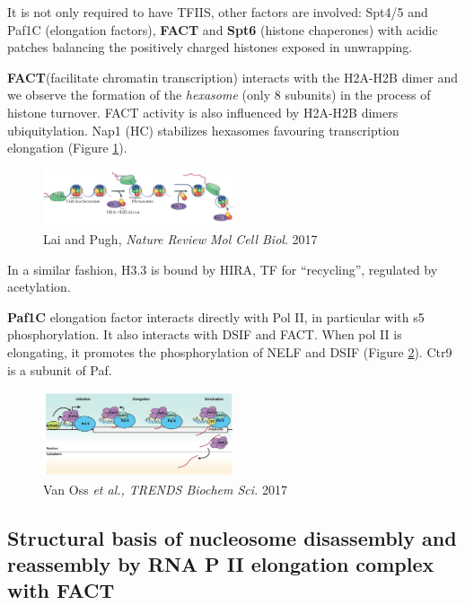 It is not only required to have TFIIS, other factors are involved: Spt4/5 and Paf1C (elongation factors), \textbf{FACT} and \textbf{Spt6} (histone chaperones) with acidic patches balancing the positively charged histones exposed in unwrapping.

\textbf{FACT}(facilitate chromatin transcription) interacts with the H2A-H2B dimer and we observe the formation of the \emph{hexasome} (only 8 subunits) in the process of histone turnover. FACT activity is also influenced by H2A-H2B dimers ubiquitylation. Nap1 (HC) stabilizes hexasomes favouring transcription elongation (Figure \ref{fig:FACT}).

\begin{figure}
\centering
\includegraphics[width=0.5\textwidth]{../_resources/Screenshot_2022-10-05_at_23-05-01.png}
\caption{Lai and Pugh, \emph{Nature Review Mol Cell Biol}. 2017}
\label{fig:FACT}
\end{figure}

In a similar fashion, H3.3 is bound by HIRA, TF for ``recycling'', regulated by acetylation.

\textbf{Paf1C} elongation factor interacts directly with Pol II, in particular with s5 phosphorylation. It also interacts with DSIF and FACT. When pol II is elongating, it promotes the phosphorylation of NELF and DSIF (Figure \ref{fig:el}). Ctr9 is a subunit of Paf.

\begin{figure}
\centering
\includegraphics[width=0.5\textwidth]{../_resources/Screenshot_2022-10-05_at_23-05-58.png}
\caption{Van Oss \emph{et al., TRENDS Biochem Sci.} 2017}
\label{fig:el}
\end{figure}


\hypertarget{structural-basis-of-nucleosome-disassembly-and-reassembly-by-rna-p-ii-elongation-complex-with-fact---ehara-et-al.}{%
\subsection{Structural basis of nucleosome disassembly and reassembly by RNA P II elongation complex with FACT}\label{structural-basis-of-nucleosome-disassembly-and-reassembly-by-rna-p-ii-elongation-complex-with-fact---ehara-et-al.}}

